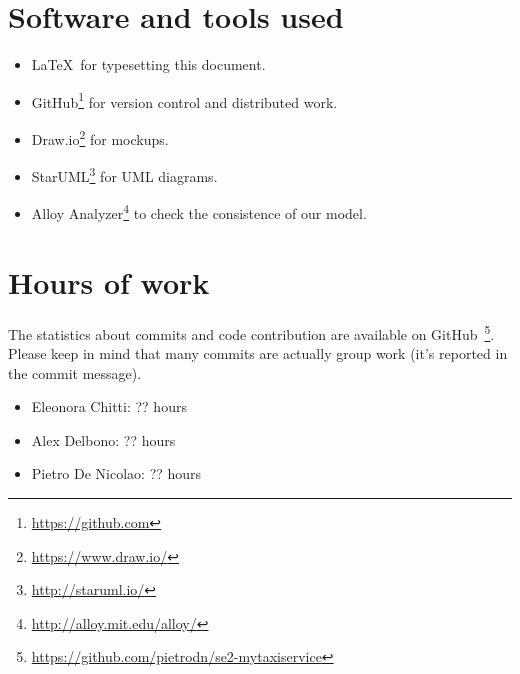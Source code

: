 \section{Software and tools used}
\begin{itemize}
    \item \LaTeX\, for typesetting this document.
    \item GitHub\footnote{\url{https://github.com}} for version control and distributed work.
    \item Draw.io\footnote{\url{https://www.draw.io/}} for mockups.
    \item StarUML\footnote{\url{http://staruml.io/}} for UML diagrams.
    \item Alloy Analyzer\footnote{\url{http://alloy.mit.edu/alloy/}} to check the consistence of our model.
\end{itemize}

\section{Hours of work}
The statistics about commits and code contribution are available on GitHub~\footnote{\url{https://github.com/pietrodn/se2-mytaxiservice}}.
Please keep in mind that many commits are actually group work (it's reported in the commit message).
\begin{itemize}
    \item Eleonora Chitti: ?? hours
    \item Alex Delbono: ?? hours
    \item Pietro De Nicolao: ?? hours
\end{itemize}
